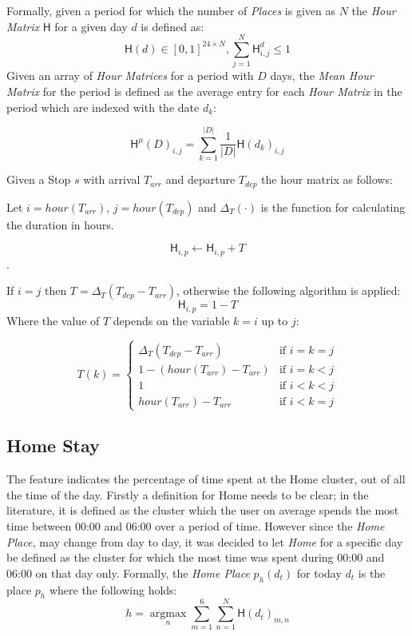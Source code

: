 Formally, given a period for which the number of \textit{Places} is given as $N$ the \textit{Hour Matrix} $\mathsf{H}$ for a given day $d$ is defined as:
$$\mathsf{H}(d) \in [0,1]^{24 \times N}, \sum_{j=1}^N \mathsf{H}^d_{i,j} \leq 1$$
Given an array of \textit{Hour Matrices} for a period with $D$ days, the \textit{Mean Hour Matrix} for the period is defined as the average entry for each \textit{Hour Matrix} in the period which are indexed with the date $d_k$:

$$\mathsf{H}^{\mu} (D) _{i,j} = \sum_{k=1}^{|D|} \frac{1}{|D|} \mathsf{H}(d_k)_{i,j}$$

Given a Stop $s$ with arrival $T_{arr}$ and departure $T_{dep}$ the hour matrix as follows:

Let $i = hour(T_{arr})$, $j = hour(T_{dep})$ and $\Delta_ T(\cdot)$ is the function for calculating the duration in hours.

$$\mathsf{H}_{i,p} \leftarrow \mathsf{H}_{i,p} + T$$. 

If $i = j$ then $T = \Delta_T (T_{dep} - T_{arr})$, otherwise the following algorithm is applied:\\

$$\mathsf{H}_{i,p} = 1 - T$$
Where the value of $T$ depends on the variable $k = i$ up to $j$:

\[
  T(k) =
  \begin{cases}
\Delta_T (T_{dep} - T_{arr})            & \text{if $i = k = j$} \\
1 - (hour(T_{arr}) - T_{arr}) & \text{if $i = k < j$} \\
1                                       & \text{if $i < k < j$} \\
hour(T_{arr}) - T_{arr}       & \text{if $i < k = j$}
  \end{cases}
\]

\subsection{Home Stay}
The  feature indicates the percentage of time spent at the Home cluster, out of all the time of the day. Firstly a definition for Home needs to be clear; in the literature, it is defined as the cluster which the user on average spends the most time between 00:00 and 06:00 over a period of time. However since the \textit{Home Place,} may change from day to day, it was decided to let \textit{Home} for a specific day be defined as the cluster for which the most time was spent during 00:00 and 06:00 on that day only. Formally, the \textit{Home Place} $p_h (d_t)$ for today $d_t$ is the place $p_h$ where the following holds:
$$h = \operatorname*{argmax}_n \sum_{m=1}^{6} \sum_{n=1}^{N}  \mathsf{H}(d_t)_{m,n}$$

